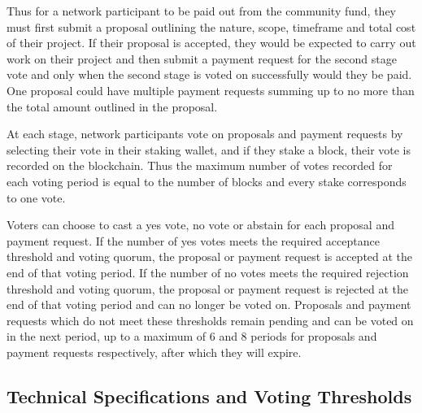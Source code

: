 Thus for a network participant to be paid out from the community fund, they must first submit a proposal 
outlining the nature, scope, timeframe and total cost of their project.  If their proposal is accepted, 
they would be expected to carry out work on their project and then submit a payment request for the second 
stage vote and only when the second stage is voted on successfully would they be paid. One proposal could 
have multiple payment requests summing up to no more than the total amount outlined in the proposal.

At each stage, network participants vote on proposals and payment requests by selecting their vote in their 
staking wallet, and if they stake a block, their vote is recorded on the blockchain. Thus the maximum number 
of votes recorded for each voting period is equal to the number of blocks and every stake corresponds to one vote. 

Voters can choose to cast a yes vote, no vote or abstain for each proposal and payment request. If the number 
of yes votes meets the required acceptance threshold and voting quorum, the proposal or payment request is 
accepted at the end of that voting period. If the number of no votes meets the required rejection threshold 
and voting quorum, the proposal or payment request is rejected at the end of that voting period and can no 
longer be voted on. Proposals and payment requests which do not meet these thresholds remain pending and 
can be voted on in the next period, up to a maximum of 6 and 8 periods for proposals and payment requests 
respectively, after which they will expire.

\subsection{Technical Specifications and Voting Thresholds}

